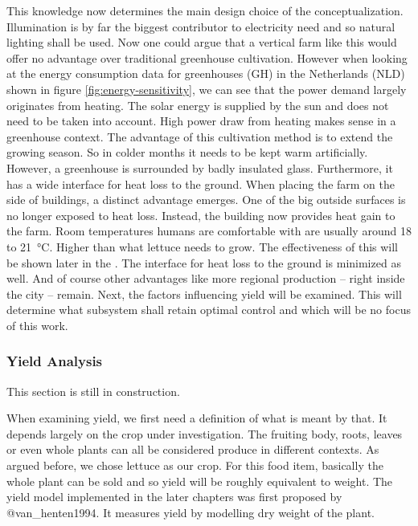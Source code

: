 This knowledge now determines the main design choice of the conceptualization.
Illumination is by far the biggest contributor to electricity need and so natural lighting shall be used.
Now one could argue that a vertical farm like this would offer no advantage over traditional greenhouse cultivation.
However when looking at the energy consumption data for greenhouses (GH) in the Netherlands (NLD) shown in figure \ref{fig:energy-sensitivity}, we can see that the power demand largely originates from heating.
The solar energy is supplied by the sun and does not need to be taken into account.
High power draw from heating makes sense in a greenhouse context.
The advantage of this cultivation method is to extend the growing season.
So in colder months it needs to be kept warm artificially.
However, a greenhouse is surrounded by badly insulated glass.
Furthermore, it has a wide interface for heat loss to the ground.
When placing the farm on the side of buildings, a distinct advantage emerges.
One of the big outside surfaces is no longer exposed to heat loss.
Instead, the building now provides heat gain to the farm.
Room temperatures humans are comfortable with are usually around 18 to \SI{21}{\degreeCelsius}.
Higher than what lettuce needs to grow.
The effectiveness of this will be shown later in the .
The interface for heat loss to the ground is minimized as well.
And of course other advantages like more regional production -- right inside the city -- remain.
Next, the factors influencing yield will be examined.
This will determine what subsystem shall retain optimal control and which will be no focus of this work.

\subsubsection{Yield Analysis}
\label{subsub:yield-analysis}
This section is still in construction.

When examining yield, we first need a definition of what is meant by that.
It depends largely on the crop under investigation.
The fruiting body, roots, leaves or even whole plants can all be considered produce in different contexts.
As argued before, we chose lettuce as our crop.
For this food item, basically the whole plant can be sold and so yield will be roughly equivalent to weight.
The yield model implemented in the later chapters was first proposed by @van\_henten1994.
It measures yield by modelling dry weight of the plant.

